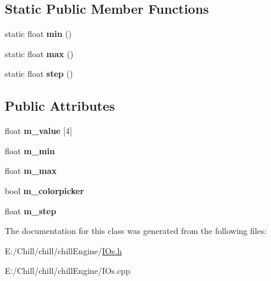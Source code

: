 \subsection*{Static Public Member Functions}
\begin{DoxyCompactItemize}
\item 
\mbox{\label{class_chill_1_1_vec4_input_a92f664df3bd480d29e3eb8dc97758fb3}} 
static float {\bfseries min} ()
\item 
\mbox{\label{class_chill_1_1_vec4_input_ad810cc739c23584df693973da9262b19}} 
static float {\bfseries max} ()
\item 
\mbox{\label{class_chill_1_1_vec4_input_a90702ff48623192730324b48eba0cc7f}} 
static float {\bfseries step} ()
\end{DoxyCompactItemize}
\subsection*{Public Attributes}
\begin{DoxyCompactItemize}
\item 
\mbox{\label{class_chill_1_1_vec4_input_a66d187a72e0528509020a3d488ff653a}} 
float {\bfseries m\+\_\+value} \mbox{[}4\mbox{]}
\item 
\mbox{\label{class_chill_1_1_vec4_input_a8957f9578b241426ccdd827a3dc1efef}} 
float {\bfseries m\+\_\+min}
\item 
\mbox{\label{class_chill_1_1_vec4_input_a4a2b9e0dc8b7f502bb40b143d14bf88d}} 
float {\bfseries m\+\_\+max}
\item 
\mbox{\label{class_chill_1_1_vec4_input_ab0f331608a8c9a87bec813c98924aa9c}} 
bool {\bfseries m\+\_\+colorpicker}
\item 
\mbox{\label{class_chill_1_1_vec4_input_ad537a48553b5bc4b4edf69f9ecf4b3a1}} 
float {\bfseries m\+\_\+step}
\end{DoxyCompactItemize}


The documentation for this class was generated from the following files\+:\begin{DoxyCompactItemize}
\item 
E\+:/\+Chill/chill/chill\+Engine/\mbox{\hyperlink{_i_os_8h}{I\+Os.\+h}}\item 
E\+:/\+Chill/chill/chill\+Engine/I\+Os.\+cpp\end{DoxyCompactItemize}
